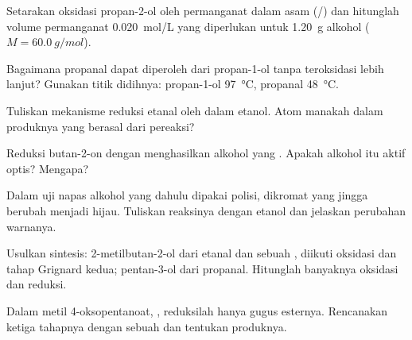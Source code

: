 \begin{exercise}[$\star\star$]\label{exo:b1:organic-redox:5}
Setarakan oksidasi propan-2-ol oleh permanganat dalam asam
(/) dan hitunglah volume permanganat
\qty{0.020}{mol/L} yang diperlukan untuk \qty{1.20}{g} alkohol ($M = \qty{60.0}{g/mol}$).
\end{exercise}

\begin{exercise}[$\star\star$]\label{exo:b1:organic-redox:6}
Bagaimana propanal dapat diperoleh dari propan-1-ol tanpa teroksidasi
lebih lanjut? Gunakan titik didihnya: propan-1-ol \qty{97}{\celsius},
propanal \qty{48}{\celsius}.
\end{exercise}

\begin{exercise}[$\star\star$]\label{exo:b1:organic-redox:7}
Tuliskan mekanisme reduksi etanal oleh  dalam etanol. Atom
manakah dalam produknya yang berasal dari pereaksi?
\end{exercise}

\begin{exercise}[$\star\star$]\label{exo:b1:organic-redox:8}
Reduksi butan-2-on dengan  menghasilkan alkohol yang .
Apakah alkohol itu aktif optis? Mengapa?
\end{exercise}

\begin{exercise}[$\star\star$]\label{exo:b1:organic-redox:9}
Dalam uji napas alkohol yang dahulu dipakai polisi, dikromat yang jingga
berubah menjadi hijau. Tuliskan reaksinya dengan etanol dan jelaskan
perubahan warnanya.
\end{exercise}

\begin{exercise}[$\star\star\star$]\label{exo:b1:organic-redox:10}
Usulkan sintesis: 2-metilbutan-2-ol dari etanal dan sebuah , diikuti oksidasi dan tahap Grignard kedua; pentan-3-ol dari
propanal. Hitunglah banyaknya oksidasi dan reduksi.
\end{exercise}

\begin{exercise}[$\star\star\star$]\label{exo:b1:organic-redox:11}
Dalam metil 4-oksopentanoat, , reduksilah hanya gugus
esternya. Rencanakan ketiga tahapnya dengan sebuah 
dan tentukan produknya.
\end{exercise}

